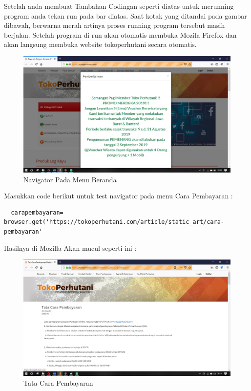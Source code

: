 Setelah anda membuat Tambahan Codingan  seperti diatas untuk merunning program anda tekan run pada bar diatas. Saat kotak yang ditandai pada gambar dibawah, berwarna merah artinya proses running program tersebut masih berjalan. Setelah program di run akan otomatis membuka Mozila Firefox dan akan langsung membuka website tokoperhutani secara otomatis.

\begin{figure}[h]
\centering
\includegraphics[scale=0.3]{figures/1x}
\caption{Navigator Pada Menu Beranda}
\end{figure}

Masukkan code berikut untuk test navigator pada menu Cara Pembayaran :

\begin{verbatim}
  carapembayaran= browser.get('https://tokoperhutani.com/article/static_art/cara-pembayaran'
\end{verbatim}

Hasilnya  di Mozilla Akan mucul seperti ini :
\begin{figure}[h]
\centering
\includegraphics[scale=0.3]{figures/2}
\caption{Tata Cara Pembayaran}
\end{figure}

